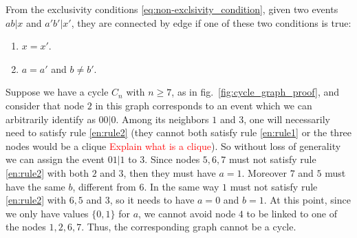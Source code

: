 \documentclass[letterpaper]{article}
\newcommand{\STAB}{\mathrm{STAB}}
\renewcommand{\TH}{\mathrm{TH}}
\begin{document}
From the exclusivity conditions \eqref{eq:non-exclsivity_condition},
given two events $ab|x$ and $a'b'|x'$, they are connected by edge if one of these two conditions is true:
\begin{enumerate}
    \item $x=x'$.\label{en:rule1}
    \item $a=a'$ and $b \neq b'$.\label{en:rule2}
\end{enumerate}
Suppose we have a cycle $C_n$ with $n \ge 7$, as in fig.~\ref{fig:cycle_graph_proof},
and consider that node $2$ in this graph corresponds to an event which we can arbitrarily identify as $00|0$.
Among its neighbors $1$ and $3$, one will necessarily need to satisfy rule \ref{en:rule2} (they cannot both satisfy rule \ref{en:rule1} or the three nodes would be a clique \textcolor{red}{Explain what is a clique}).
So without loss of generality we can assign the event $01|1$ to $3$.
Since nodes $5,6,7$ must not satisfy rule \ref{en:rule2} with both $2$ and $3$, then they must have $a = 1$.
Moreover $7$ and $5$ must have the same $b$, different from $6$. In the same way $1$ must not satisfy rule \ref{en:rule2} with $6,5$ and $3$, so it
needs to have $a=0$ and $b=1$. At this point, since we only have values $\{0,1\}$ for $a$, we cannot avoid node $4$ to be linked to one of the nodes $1,2,6,7$. Thus, the corresponding graph cannot be a cycle.


%
%
%
\end{document}
